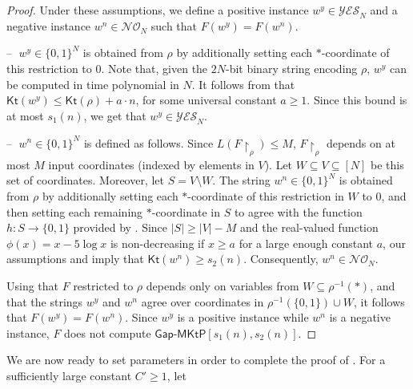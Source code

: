\documentclass{toc}
\newcommand{\gapmktp}{\mathsf{Gap}$-$\mathsf{MKtP}}
\newcommand{\Kt}{\mathsf{Kt}}
\begin{document}
\begin{proof}
Under these assumptions, we define a positive instance $w^y \in \mathcal{YES}_N$ and a negative instance $w^n \in \mathcal{NO}_N$ such that $F(w^y) = F(w^n)$.\\

\vspace{-0.3cm}

\noindent -- $\;w^y \in \{0,1\}^N$ is obtained from $\rho$ by additionally setting each $*$-coordinate of this restriction to $0$. Note that, given the $2N$-bit binary string encoding $\rho$, $w^y$ can be computed in time polynomial in $N$. It follows from  that $\Kt(w^y) \leq \Kt(\rho) + a \cdot n$, for some universal constant $a \geq 1$. Since this bound is at most $s_1(n)$, we get that $w^y \in \mathcal{YES}_N$.\\

\vspace{-0.3cm}

\noindent -- $\;w^n \in \{0,1\}^N$ is defined as follows. Since $L(F\!\upharpoonright_\rho) \leq M$,  $F\!\upharpoonright_\rho$ depends on at most $M$ input coordinates (indexed by elements in  $V$). Let $W \subseteq V \subseteq [N]$ be this set of coordinates. Moreover, let $S = V \setminus W$. The string $w^n \in \{0,1\}^N$ is obtained from $\rho$ by additionally setting each $*$-coordinate of this restriction in $W$ to $0$, and then setting each remaining $*$-coordinate in $S$ to agree with the function $h \colon S \to \{0,1\}$ provided by . Since $|S| \geq |V| - M$ and the real-valued function $\phi(x) = x - 5\log x$ is non-decreasing if $x \geq a$ for a large enough constant $a$, our assumptions and  imply that $\Kt(w^n) \geq s_2(n)$. Consequently, $w^n \in \mathcal{NO}_N$.\\

\vspace{-0.3cm}

Using that $F$ restricted to $\rho$ depends only on variables from $W \subseteq \rho^{-1}(*)$, and that the strings $w^y$ and $w^n$ agree over coordinates in $\rho^{-1}(\{0,1\}) \cup W$, it follows that $F(w^y) = F(w^n)$. Since $w^y$ is a positive instance while $w^n$ is a negative instance, $F$ does not compute $\gapmktp[s_1(n), s_2(n)]$.
\end{proof}

We are now ready to set parameters in order to complete the proof of . For a sufficiently large constant $C' \geq 1$, let
\end{document}
